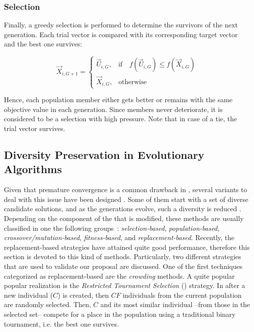 \subsubsection{Selection}
Finally, a greedy selection is performed to determine the survivors of the next generation.
%
Each trial vector is compared with its corresponding target vector and the best one survives:

\begin{equation} \label{eqn:selection}
\vec{X}_{i,G+1}= 
\begin{cases}
    \vec{U}_{i,G},& \text{if} \quad f(\vec{U}_{i,G}) \leq f(\vec{X}_{i,G})  \\
    \vec{X}_{i,G},              & \text{otherwise}
\end{cases}
\end{equation}

Hence, each population member either gets better or remains with the same objective value in each generation.
%
Since members never deteriorate, it is considered to be a selection with high pressure.
%
Note that in case of a tie, the trial vector survives.

%



\subsection{Diversity Preservation in Evolutionary Algorithms}

Given that premature convergence is a common drawback in  \EAS{}, several variants to deal with this issue have been designed \cite{eshelman1993real}.
%
Some of them start with a set of diverse candidate solutions, and as the generations evolve, such a diversity is reduced \cite{Crepinsek:13}.
%
Depending on the component of the \EA{} that is modified, these methods are usually classified in one the following groups~\cite{Crepinsek:13}: \textit{selection-based}, \textit{population-based}, \textit{crossover/mutation-based}, \textit{fitness-based}, and \textit{replacement-based}.
%
Recently, the replacement-based strategies have attained quite good performance, therefore this section is devoted to this kind
of methods.
%
Particularly, two different strategies that are used to validate our proposal are discussed.
%
One of the first techniques categorized as replacement-based are the \textit{crowding} methods.
%
A quite popular popular realization is the \textit{Restricted Tournament Selection} \cite{harik1995finding} (\RTS{}) strategy.
%
In \RTS{} after a new individual ($C$) is created, then $CF$ individuals from the current population are randomly selected.
%
Then, $C$ and its most similar individual --from those in the selected set-- compete for a place in the population using a traditional binary tournament, i.e. the best one survives.
%

